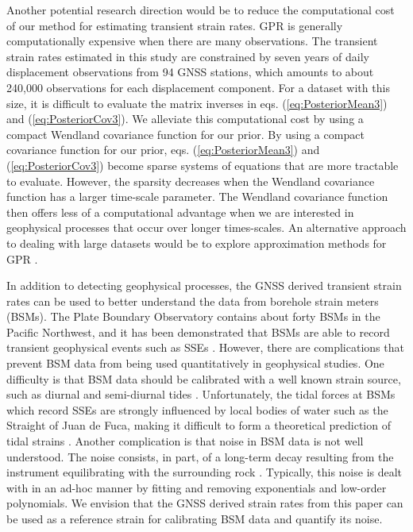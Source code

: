 \documentclass[extra,mreferee]{gji}
\begin{document}



Another potential research direction would be to reduce the
computational cost of our method for estimating transient strain
rates. GPR is generally computationally expensive when there are many
observations. The transient strain rates estimated in this study are
constrained by seven years of daily displacement observations from 94
GNSS stations, which amounts to about 240,000 observations for each
displacement component. For a dataset with this size, it is difficult
to evaluate the matrix inverses in eqs. (\ref{eq:PosteriorMean3}) and
(\ref{eq:PosteriorCov3}). We alleviate this computational cost by
using a compact Wendland covariance function for our prior. By using a
compact covariance function for our prior, eqs.
(\ref{eq:PosteriorMean3}) and (\ref{eq:PosteriorCov3}) become sparse
systems of equations that are more tractable to evaluate. However, the
sparsity decreases when the Wendland covariance function has a larger
time-scale parameter. The Wendland covariance function then offers
less of a computational advantage when we are interested in
geophysical processes that occur over longer times-scales. An
alternative approach to dealing with large datasets would be to
explore approximation methods for GPR \citep[ch. 8]{Rasmussen2006}.


In addition to detecting geophysical processes, the GNSS derived
transient strain rates can be used to better understand the data from
borehole strain meters (BSMs). The Plate Boundary Observatory contains
about forty BSMs in the Pacific Northwest, and it has been
demonstrated that BSMs are able to record transient geophysical events
such as SSEs \citep[e.g.,][]{Dragert2011}. However, there are
complications that prevent BSM data from being used quantitatively in
geophysical studies. One difficulty is that BSM data should be
calibrated with a well known strain source, such as diurnal and
semi-diurnal tides \citep{Hart1996,Roeloffs2010,Hodgkinson2013}.
Unfortunately, the tidal forces at BSMs which record SSEs are strongly
influenced by local bodies of water such as the Straight of Juan de
Fuca, making it difficult to form a theoretical prediction of tidal
strains \citep{Roeloffs2010}. Another complication is that noise in
BSM data is not well understood. The noise consists, in part, of a
long-term decay resulting from the instrument equilibrating with the
surrounding rock \citep{Gladwin1987}. Typically, this noise is dealt
with in an ad-hoc manner by fitting and removing exponentials and
low-order polynomials. We envision that the GNSS derived strain rates
from this paper can be used as a reference strain for calibrating BSM
data and quantify its noise.
\end{document}
